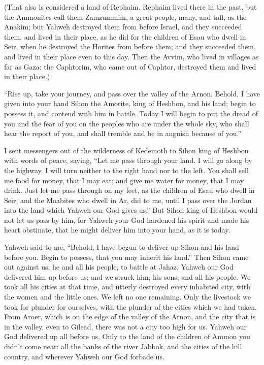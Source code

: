  (That also is considered a land of Rephaim. Rephaim lived
there in the past, but the Ammonites call them Zamzummim, 
a great people, many, and tall, as the Anakim; but Yahweh destroyed them
from before Israel, and they succeeded them, and lived in their place,
 as he did for the children of Esau who dwell in Seir, when
he destroyed the Horites from before them; and they succeeded them, and
lived in their place even to this day.  Then the Avvim, who
lived in villages as far as Gaza: the Caphtorim, who came out of
Caphtor, destroyed them and lived in their place.)

 ``Rise up, take your journey, and pass over the valley of
the Arnon. Behold, I have given into your hand Sihon the Amorite, king
of Heshbon, and his land; begin to possess it, and contend with him in
battle.  Today I will begin to put the dread of you and the
fear of you on the peoples who are under the whole sky, who shall hear
the report of you, and shall tremble and be in anguish because of you.''

 I sent messengers out of the wilderness of Kedemoth to
Sihon king of Heshbon with words of peace, saying,  ``Let
me pass through your land. I will go along by the highway. I will turn
neither to the right hand nor to the left.  You shall sell
me food for money, that I may eat; and give me water for money, that I
may drink. Just let me pass through on my feet,  as the
children of Esau who dwell in Seir, and the Moabites who dwell in Ar,
did to me, until I pass over the Jordan into the land which Yahweh our
God gives us.''  But Sihon king of Heshbon would not let us
pass by him, for Yahweh your God hardened his spirit and made his heart
obstinate, that he might deliver him into your hand, as it is today.

 Yahweh said to me, ``Behold, I have begun to deliver up
Sihon and his land before you. Begin to possess, that you may inherit
his land.''  Then Sihon came out against us, he and all his
people, to battle at Jahaz.  Yahweh our God delivered him
up before us; and we struck him, his sons, and all his people.
 We took all his cities at that time, and utterly destroyed
every inhabited city, with the women and the little ones. We left no one
remaining.  Only the livestock we took for plunder for
ourselves, with the plunder of the cities which we had taken.
 From Aroer, which is on the edge of the valley of the
Arnon, and the city that is in the valley, even to Gilead, there was not
a city too high for us. Yahweh our God delivered up all before us.
 Only to the land of the children of Ammon you didn't come
near: all the banks of the river Jabbok, and the cities of the hill
country, and wherever Yahweh our God forbade us.

